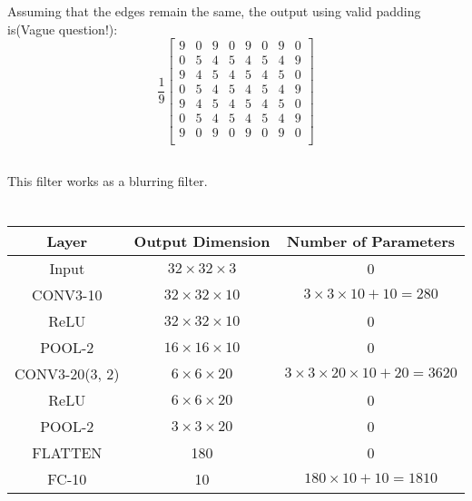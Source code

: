 \documentclass[11pt]{scrartcl} %
\begin{document}
Assuming that the edges remain the same, the output using valid padding is(Vague question!):
\begin{equation}
\frac{1}{9}
\begin{bmatrix}
9 & 0 & 9 & 0 & 9 & 0 & 9 & 0\\
0 & 5 & 4 & 5 & 4 & 5 & 4 & 9\\
9 & 4 & 5 & 4 & 5 & 4 & 5 & 0\\
0 & 5 & 4 & 5 & 4 & 5 & 4 & 9\\
9 & 4 & 5 & 4 & 5 & 4 & 5 & 0\\
0 & 5 & 4 & 5 & 4 & 5 & 4 & 9\\
9 & 0 & 9 & 0 & 9 & 0 & 9 & 0\\
\end{bmatrix}
\end{equation}



\subsection{} %
This filter works as a blurring filter.
\section{} %
\begin{table}[h]
\centering
\begin{tabular}{|c|c|c|}
\hline
Layer & Output Dimension & Number of Parameters\\
\hline
Input & $32 \times 32 \times 3$ & 0\\
\hline
CONV3-10 & $32 \times 32 \times 10$ & $3 \times 3 \times 10 + 10 = 280$\\
\hline
ReLU & $32 \times 32 \times 10$ & 0\\
\hline
POOL-2 & $16 \times 16 \times 10$ & 0\\
\hline
CONV3-20(3, 2) & $6 \times 6 \times 20$ & $3 \times 3 \times 20 \times 10 + 20 = 3620$\\
\hline
ReLU & $6 \times 6 \times 20$ & 0\\
\hline
POOL-2 & $3 \times 3 \times 20$ & 0\\
\hline
FLATTEN & 180 & 0\\
\hline
FC-10 & 10 & $180 \times 10 + 10 = 1810$\\
\hline
\end{tabular}
\end{table}
\end{document}
